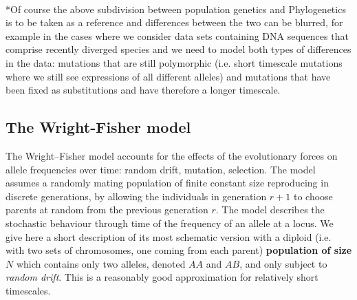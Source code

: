 \documentclass[12pt,mythesisstyle]{report}
\begin{document}
\\*Of course the above subdivision between population genetics and Phylogenetics is to be taken as a reference and differences between the two can be blurred, for example in the cases where we consider data sets containing DNA sequences that comprise recently diverged species and we need to model both types of differences in the data: mutations that are still polymorphic (i.e. short timescale mutations where we still see expressions of all different alleles) and mutations that have been fixed as substitutions and have therefore a longer timescale\cite{wrightexplained}.

\subsection{The Wright-Fisher model}\label{section: wright-fisher}
The Wright–Fisher model \cite{wright1931} \cite{fisher} \cite{wrightexplained} accounts for the effects of the evolutionary forces on allele frequencies over time: random drift, mutation, selection. The model assumes a randomly mating population of finite constant size reproducing in discrete generations, by allowing the individuals in generation $r + 1$ to choose parents at random from the previous generation $r$. The model describes the stochastic behaviour through time of the frequency of an allele at a locus. We give here a short description of its most schematic version with a diploid (i.e. with two sets of chromosomes, one coming from each parent) \textbf{population of size $N$} which contains only two alleles, denoted $AA$ and $AB$, and only subject to \textit{random drift}. This is a reasonably good approximation for relatively short timescales.
\end{document}
